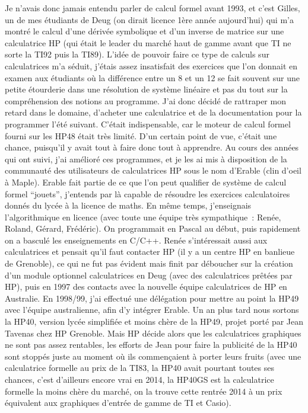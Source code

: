 \documentclass[a4paper,11pt]{article}
\begin{document}
Je n'avais donc jamais entendu parler de calcul formel
avant 1993, et c'est Gilles, un de mes \'etudiants de Deug (on
dirait licence 1\`ere ann\'ee aujourd'hui) qui m'a montr\'e
le calcul d'une d\'eriv\'ee symbolique et d'un inverse
de matrice sur une calculatrice HP (qui \'etait le leader du march\'e
haut de gamme avant que TI ne sorte la TI92 puis la TI89).
L'id\'ee de pouvoir faire ce type de calculs sur calculatrices
m'a s\'eduit, j'\'etais assez insatisfait des exercices
que l'on donnait en examen aux \'etudiants o\`u la
diff\'erence entre un 8 et un 12 se fait souvent sur une petite
\'etourderie dans une r\'esolution de syst\`eme lin\'eaire
et pas du tout sur la compr\'ehension des notions au programme.
J'ai donc d\'ecid\'e de rattraper mon retard dans le domaine,
d'acheter une calculatrice et de la documentation pour la
programmer l'\'et\'e suivant. C'\'etait indispensable, car le moteur
de calcul formel fourni sur les HP48 \'etait tr\`es limit\'e. D'un
certain point de vue, c'\'etait une chance, puisqu'il y avait
tout \`a faire donc tout \`a apprendre.
Au cours des ann\'ees qui ont suivi, j'ai am\'elior\'e ces programmes,
et je les ai mis \`a disposition de la communaut\'e des utilisateurs
de calculatrices HP sous le nom d'Erable (clin d'oeil \`a Maple).
Erable fait partie de ce que l'on peut qualifier de syst\`eme de
calcul formel ``jouets'', j'entends par l\`a capable de r\'esoudre
les exercices calculatoires donn\'es du lyc\'ee \`a la licence de maths.
En m\^eme temps, j'enseignais
l'algorithmique en licence (avec toute
une \'equipe tr\`es sympathique~: Ren\'ee, Roland,
G\'erard, Fr\'ed\'eric). On programmait en Pascal au d\'ebut, puis
rapidement on a bascul\'e les enseignements en C/C++.
Ren\'ee s'int\'eressait
aussi aux calculatrices et pensait qu'il faut contacter HP (il
y a un centre HP en banlieue de Grenoble),
ce qui ne fut pas \'evident mais finit par d\'eboucher sur
la cr\'eation d'un module optionnel calculatrices en Deug
(avec des calculatrices pr\^et\'ees par HP),
puis en 1997 des contacts avec la nouvelle \'equipe calculatrices
de HP en Australie. En 1998/99, j'ai effectu\'e une d\'el\'egation
pour mettre au point la HP49 avec l'\'equipe australienne,
afin d'y intégrer Erable.
Un an plus tard nous sortons
la HP40, version lyc\'ee simplifi\'ee et moins ch\`ere de la HP49,
projet port\'e par Jean Tavenas chez HP Grenoble.
Mais HP d\'ecide alors que les calculatrices graphiques
ne sont pas assez rentables, les efforts de Jean pour
faire la publicit\'e de la HP40 sont stopp\'es juste au
moment o\`u ils commen\c{c}aient \`a porter leurs fruits
(avec une calculatrice formelle au prix de la TI83,
la HP40 avait pourtant toutes ses chances, c'est
d'ailleurs encore vrai en 2014,
la HP40GS est la calculatrice formelle
la moins ch\`ere du march\'e, on la trouve cette rentr\'ee 2014
\`a un prix \'equivalent aux graphiques d'entr\'ee de gamme de TI et Casio).
\end{document}

